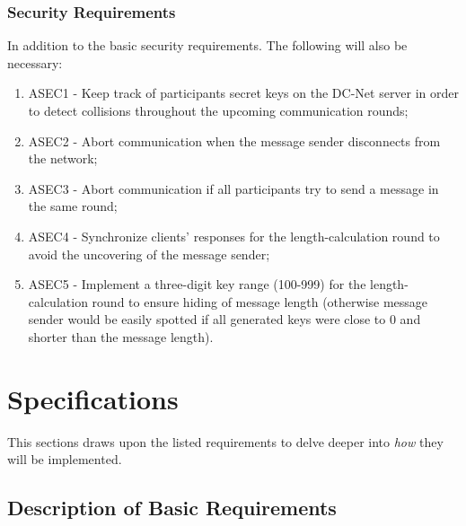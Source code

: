 \subsubsection{Security Requirements}
In addition to the basic security requirements. The following will also be necessary:
\begin{enumerate}
    \item ASEC1 - Keep track of participants secret keys on the DC-Net server in order to detect collisions throughout the upcoming communication rounds;
    \item ASEC2 - Abort communication when the message sender disconnects from the network;
    \item ASEC3 - Abort communication if all participants try to send a message in the same round;
    \item ASEC4 - Synchronize clients' responses for the length-calculation round to avoid the uncovering of the message sender;
    \item ASEC5 - Implement a three-digit key range (100-999) for the length-calculation round to ensure hiding of message length (otherwise message sender would be easily spotted if all generated keys were close to 0 and shorter than the message length).
\end{enumerate}


\section{Specifications}
This sections draws upon the listed requirements to delve deeper into \emph{how} they will be implemented.


\subsection{Description of Basic Requirements}

